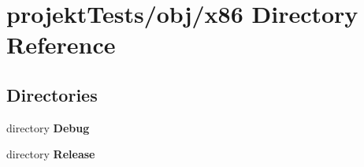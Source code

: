\section{projekt\+Tests/obj/x86 Directory Reference}
\label{dir_016d163e29bd58cfe2292dad18050249}
\subsection*{Directories}
\begin{DoxyCompactItemize}
\item 
directory \textbf{ Debug}
\item 
directory \textbf{ Release}
\end{DoxyCompactItemize}
